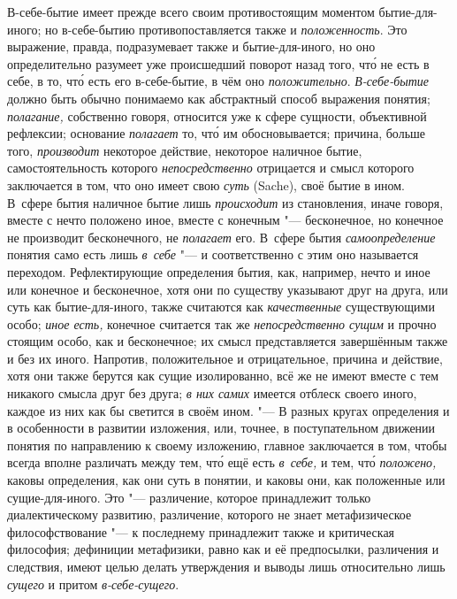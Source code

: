 В-себе-бытие имеет прежде всего своим противостоящим моментом
бытие-для-иного; но в-себе-бытию противопоставляется также и
{\em положенность}. Это выражение, правда,
подразумевает также и бытие-для-иного, но оно определительно разумеет уже
происшедший поворот назад того, чт\'{о} не есть в себе, в то, чт\'{о} есть его
в-себе-бытие, в чём оно {\em положительно}.
{\em В-себе-бытие} должно быть обычно понимаемо как
абстрактный способ выражения понятия; {\em полагание,}
собственно говоря, относится уже к сфере сущности, объективной рефлексии;
основание {\em полагает} то, чт\'{о} им обосновывается;
причина, больше того, {\em производит} некоторое
действие, некоторое наличное бытие, самостоятельность которого
{\em непосредственно} отрицается и смысл которого
заключается в том, что оно имеет свою {\em суть}
(Sache), своё бытие в ином. В~сфере бытия наличное бытие лишь
{\em происходит} из становления, иначе говоря, вместе с нечто
положено иное, вместе с конечным "--- бесконечное, но конечное не
производит бесконечного, не {\em полагает} его. В~сфере
бытия {\em самоопределение} понятия само есть лишь
{\em в~себе} "--- и соответственно с этим оно называется
переходом. Рефлектирующие определения бытия, как, например, нечто и иное
или конечное и бесконечное, хотя они по существу указывают друг на друга,
или суть как бытие-для-иного, также считаются как
{\em качественные} существующими особо;
{\em иное есть,} конечное считается так же
{\em непосредственно сущим} и прочно стоящим особо, как
и бесконечное; их смысл представляется завершённым также и без их иного.
Напротив, положительное и отрицательное, причина и действие, хотя они также
берутся как сущие изолированно, всё же не имеют вместе с тем никакого
смысла друг без друга; {\em в них самих} имеется
отблеск своего иного, каждое из них как бы светится в своём ином. "--- В
разных кругах определения и в особенности в развитии
изложения, или, точнее, в поступательном движении понятия по направлению к
своему изложению, главное заключается в том, чтобы всегда вполне различать
между тем, чт\'{о} ещё есть {\em в~себе,} и тем, чт\'{о}
{\em положено,} каковы определения, как они суть в
понятии, и каковы они, как положенные или сущие-для-иного. Это
"--- различение, которое принадлежит только диалектическому развитию,
различение, которого не знает метафизическое философствование "--- к
последнему принадлежит также и критическая философия; дефиниции метафизики,
равно как и её предпосылки, различения и следствия, имеют целью делать
утверждения и выводы лишь относительно лишь {\em сущего} и
притом {\em в-себе-сущего}.

